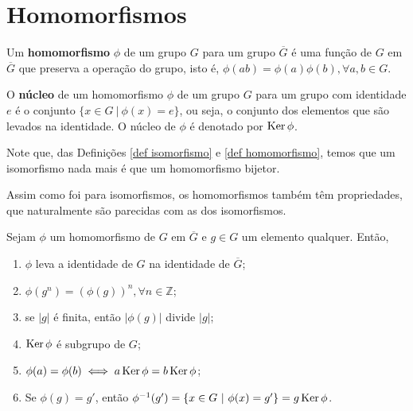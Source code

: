 \section{Homomorfismos}
\label{sec-homomorfismos}
    \begin{definition}
	\label{def homomorfismo}
		Um \textbf{homomorfismo} $\phi$ de um grupo $G$ para um grupo $\overline{G}$ é uma função 
		de $G$ em $\overline{G}$ que preserva a operação do grupo, isto é, 
		$\phi(ab) = \phi(a)\phi(b), \forall a,b\in G$.
	\end{definition}
	\begin{definition}
	\label{def nucleo}
		O \textbf{núcleo} de um homomorfismo $\phi$ de um grupo $G$ para um grupo com identidade $e$ 
		é o conjunto $\{ x\in G \ | \ \phi(x) = e \}$, ou seja, o conjunto dos elementos que são 
		levados na identidade. O núcleo de $\phi$ é denotado por $\operatorname{Ker}\phi$.
	\end{definition}
	\begin{remark}
		Note que, das Definições \ref{def isomorfismo} e \ref{def homomorfismo}, temos que um 
		isomorfismo nada mais é que um homomorfismo bijetor.
	\end{remark}
	\par\vspace{0.3cm} Assim como foi para isomorfismos, os homomorfismos também têm propriedades, que
	naturalmente são parecidas com as dos isomorfismos.
	\begin{theorem}
	\label{homomorfismos em elementos}
		Sejam $\phi$ um homomorfismo de $G$ em $\overline{G}$ e $g\in G$ um elemento qualquer. Então, 
		\begin{enumerate}
			\item $\phi$ leva a identidade de $G$ na identidade de $\overline{G}$;
			\item $\phi(g^n) = (\phi(g))^n, \forall n\in \mathbb{Z}$;
			\item se $|g|$ é finita, então $|\phi(g)|$ divide $|g|$;
			\item $\operatorname{Ker}\phi$ é subgrupo de $G$;
			\item $\phi(a) = \phi(b) \iff a\operatorname{Ker}\phi = b\operatorname{Ker}\phi$;
			\item Se $\phi(g) = g'$, então $\phi^{-1}(g') = \{ x\in G \ | \ \phi(x) = g' \} = g\operatorname{Ker}\phi$.
		\end{enumerate}
	\end{theorem}
